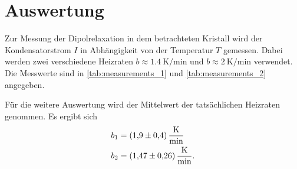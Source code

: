 \section{Auswertung}
\label{sec:Auswertung}
Zur Messung der Dipolrelaxation in dem betrachteten Kristall wird der Kondensatorstrom $I$ in Abhängigkeit von der Temperatur $T$ gemessen. Dabei werden zwei
verschiedene Heizraten $b\approx\qty{1,4}{\kelvin\per\minute}$ und $b\approx\qty{2}{\kelvin\per\minute}$ verwendet. Die Messwerte sind in \autoref{tab:measurements_1} und
\autoref{tab:measurements_2} angegeben.

Für die weitere Auswertung wird der Mittelwert der tatsächlichen Heizraten genommen. Es ergibt sich
\begin{align*}
    b_1 &= \qty{1.9+-0.4}{\kelvin\per\minute} \\
    b_2 &= \qty{1.47+-0.26}{\kelvin\per\minute}. \\
\end{align*}

